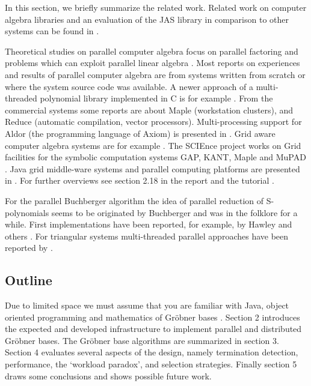 \documentclass[10pt,twocolumn,a4paper]{article}
\begin{document}
In this section, we briefly summarize the related work.  Related work
on computer algebra libraries and an evaluation of the JAS library in
comparison to other systems can be found in
\cite{Kredel:2007,Kredel:2008a}. 

Theoretical studies on parallel computer algebra focus on parallel
factoring and problems which can exploit parallel linear
algebra \cite{Lenstra:1992,zurGathen:1984}.
Most reports on experiences and results of parallel computer algebra
are from systems written from scratch or where the system source code
was available.  A newer approach of a multi-threaded polynomial
library implemented in C is for example \cite{ElDinTrebuchet:2007}.
From the commercial systems some reports are about
Maple \cite{Char:1990} (workstation clusters), and Reduce
\cite{Neun:1989} (automatic compilation, vector processors).
Multi-processing support for Aldor (the programming language of Axiom) 
is presented in \cite{MorenoMazaWatt:2007}.
Grid aware computer algebra systems are for example
\cite{GridMath:2008}.  The SCIEnce project works on Grid facilities
for the symbolic computation systems GAP, KANT, Maple and MuPAD
\cite{SCIEnce:2009,SymGrid:2007}.  
Java grid middle-ware systems and parallel computing platforms are
presented in
\cite{Ibis:2010,GridGain:2008,Caromel:2008,Kaminski:2010,AtejiPX:2010,mpj:2010}.
For further overviews see section 2.18 in the report
\cite{Grabmaier:2003} and the tutorial \cite{RochVillard:1997}.

For the parallel Buchberger algorithm the idea of parallel reduction
of S-polynomials seems to be originated by Buchberger and was in the
folklore for a while.  First implementations have been reported, for
example, by Hawley \cite{Hawley:1992} and others
\cite{Leykin:2004,Yanovich:2008,InoueSato:2007}.  For triangular
systems multi-threaded parallel approaches have been reported by
\cite{LiMorenoMaza:2007,MorenoMazaXie:2007}.


\subsection{Outline} 

Due to limited space we must assume that you are familiar with Java,
object oriented programming and mathematics of Gr\"obner bases
\cite{Becker:1993}.  Section 2 introduces the expected and developed
infrastructure to implement parallel and distributed Gr\"obner bases.
The Gr\"obner base algorithms are summarized in section 3.  Section 4
evaluates several aspects of the design, namely termination detection,
performance, the `workload paradox', and selection strategies.
Finally section 5 draws some conclusions and shows possible future
work.
\end{document}
